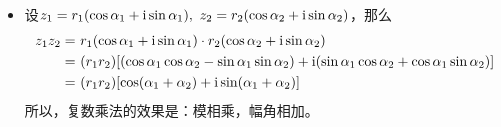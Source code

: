 \begin{itemize}[leftmargin=\inteval{\myitemleftmargin}pt,itemsep=
   \inteval{\myitemitempsep}pt,topsep=\inteval{\myitemtopsep}pt]
\noindent$\left( 1+\dfrac{1}{x}\right)^x,\dfrac{\e^x-1}{x},\dfrac{\sin x}{x} $
三者的图像如下：
\begin{figure}[h]  %
\centering
\texttt{[image: 两个重要极限图像.pdf]}
\end{figure}\\

\item 设$ z_1=r_1(\cos\alpha_1 +\i\sin\alpha_1),\ 
z_2=r_2(\cos\alpha_2 +\i\sin\alpha_2) $，那么
\begin{align*}
z_1z_2=\ & r_1(\cos\alpha_1+\mathrm{i}\sin\alpha_1)\cdot r_2(\cos
\alpha_2+\mathrm{i}\sin\alpha_2)\\=\ & (r_1r_2)[(\cos\alpha_1\cos\alpha_2-
\sin\alpha_1\sin\alpha_2)+\mathrm{i}(\sin\alpha_1\cos\alpha_2+
\cos\alpha_1\sin\alpha_2)]\\=\ & (r_1r_2)[\cos(\alpha_1+
\alpha_2)+\mathrm{i}\sin(\alpha_1+\alpha_2)]
\end{align*}
所以，复数乘法的效果是：模相乘，幅角相加。


\end{itemize}
